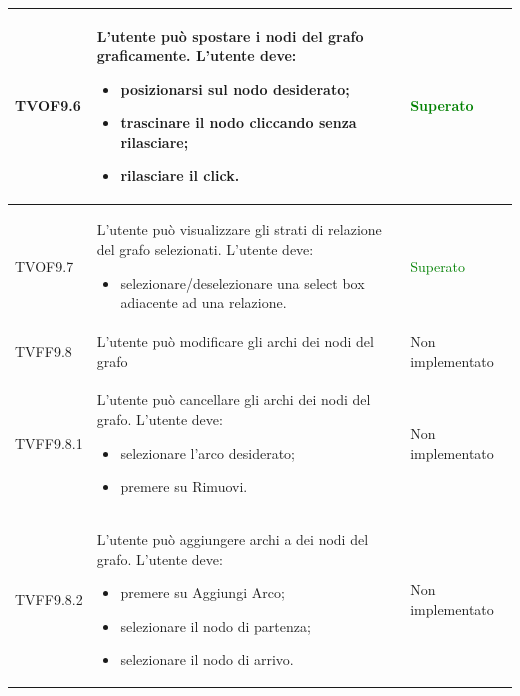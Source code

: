 \documentclass[openany,12pt,a4paper]{report}
\begin{document}
\begin{longtable}[c]{| p{2.5cm} |p{8cm} | p{2.5cm} |}
	\newline TVOF9.6&
	\newline L'utente può spostare i nodi del grafo graficamente. L'utente deve:
	\begin{itemize}
		\item posizionarsi sul nodo desiderato;
		\item trascinare il nodo cliccando senza rilasciare;
		\item rilasciare il click.
	\end{itemize}&
	\newline \textcolor{green}{Superato}
	\\[1em]
	\hline
	
	\newline TVOF9.7&
	\newline L'utente può visualizzare gli strati di relazione del grafo selezionati. L'utente deve:
	\begin{itemize}
		\item selezionare/deselezionare una select box adiacente ad una relazione.
	\end{itemize}&
	\newline \textcolor{green}{Superato}
	\\[1em]
	\hline
	
	\newline TVFF9.8&
	\newline L'utente può modificare gli archi dei nodi del grafo&
	\newline Non implementato
	\\[1em]
	\hline
	
	\newline TVFF9.8.1&
	\newline L'utente può cancellare gli archi dei nodi del grafo. L'utente deve:
	\begin{itemize}
		\item selezionare l'arco desiderato;
		\item premere su Rimuovi.
	\end{itemize}&
	\newline Non implementato
	\\[1em]
	\hline
	
	\newline TVFF9.8.2&
	\newline L'utente può aggiungere archi a dei nodi del grafo. L'utente deve:
	\begin{itemize}
		\item premere su Aggiungi Arco;
		\item selezionare il nodo di partenza;
		\item selezionare il nodo di arrivo.
	\end{itemize}&
	\newline Non implementato
	\\[1em]
	\hline
	

\end{longtable}
\end{document}
